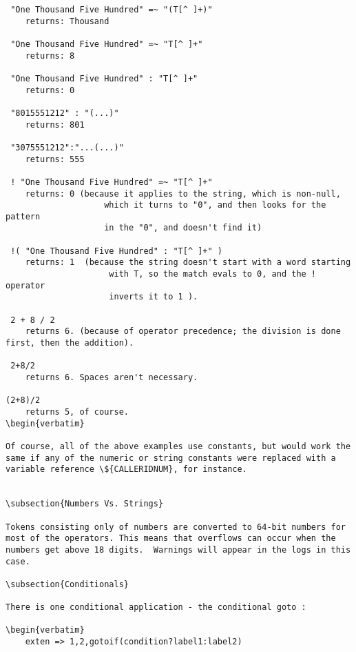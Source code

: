 \begin{verbatim}
 "One Thousand Five Hundred" =~ "(T[^ ]+)"
	returns: Thousand

 "One Thousand Five Hundred" =~ "T[^ ]+"
	returns: 8

 "One Thousand Five Hundred" : "T[^ ]+"
	returns: 0

 "8015551212" : "(...)"
	returns: 801

 "3075551212":"...(...)"
	returns: 555

 ! "One Thousand Five Hundred" =~ "T[^ ]+"
	returns: 0 (because it applies to the string, which is non-null,
                    which it turns to "0", and then looks for the pattern
                    in the "0", and doesn't find it)

 !( "One Thousand Five Hundred" : "T[^ ]+" )
	returns: 1  (because the string doesn't start with a word starting
                     with T, so the match evals to 0, and the ! operator
                     inverts it to 1 ).

 2 + 8 / 2
	returns 6. (because of operator precedence; the division is done first, then the addition).

 2+8/2
	returns 6. Spaces aren't necessary.

(2+8)/2
	returns 5, of course.
\begin{verbatim}

Of course, all of the above examples use constants, but would work the
same if any of the numeric or string constants were replaced with a
variable reference \${CALLERIDNUM}, for instance.


\subsection{Numbers Vs. Strings}

Tokens consisting only of numbers are converted to 64-bit numbers for
most of the operators. This means that overflows can occur when the
numbers get above 18 digits.  Warnings will appear in the logs in this
case.

\subsection{Conditionals}

There is one conditional application - the conditional goto : 

\begin{verbatim}
	exten => 1,2,gotoif(condition?label1:label2)
\end{verbatim}

